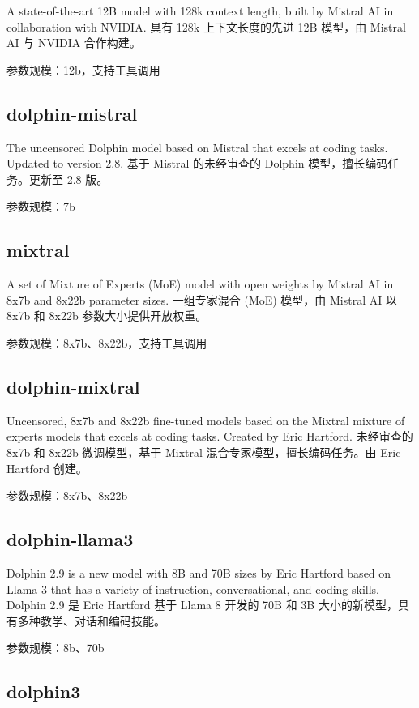 \documentclass[12pt,UTF8]{ctexbook}
\begin{document}
A state-of-the-art 12B model with 128k context length, built by Mistral AI in collaboration with NVIDIA.
具有 128k 上下文长度的先进 12B 模型，由 Mistral AI 与 NVIDIA 合作构建。

参数规模：12b，支持工具调用

\subsection{dolphin-mistral}

The uncensored Dolphin model based on Mistral that excels at coding tasks. Updated to version 2.8.
基于 Mistral 的未经审查的 Dolphin 模型，擅长编码任务。更新至 2.8 版。

参数规模：7b

\subsection{mixtral}

A set of Mixture of Experts (MoE) model with open weights by Mistral AI in 8x7b and 8x22b parameter sizes.
一组专家混合 (MoE) 模型，由 Mistral AI 以 8x7b 和 8x22b 参数大小提供开放权重。

参数规模：8x7b、8x22b，支持工具调用

\subsection{dolphin-mixtral}

Uncensored, 8x7b and 8x22b fine-tuned models based on the Mixtral mixture of experts models that excels at coding tasks. Created by Eric Hartford.
未经审查的 8x7b 和 8x22b 微调模型，基于 Mixtral 混合专家模型，擅长编码任务。由 Eric Hartford 创建。

参数规模：8x7b、8x22b

\subsection{dolphin-llama3}

Dolphin 2.9 is a new model with 8B and 70B sizes by Eric Hartford based on Llama 3 that has a variety of instruction, conversational, and coding skills.
Dolphin 2.9 是 Eric Hartford 基于 Llama 8 开发的 70B 和 3B 大小的新模型，具有多种教学、对话和编码技能。

参数规模：8b、70b

\subsection{dolphin3}
\end{document}
